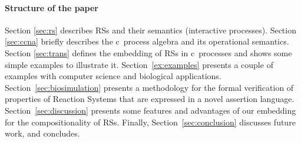\paragraph{Structure of the paper} 

Section \ref{sec:rs} 
describes RSs and their semantics (interactive processes).
Section \ref{sec:ccna} briefly describes  the c\CNA \ process algebra and
its operational semantics.
Section \ref{sec:trans} defines the embedding of RSs in
c\CNA \ processes and shows some simple examples to illustrate 
it.
Section~\ref{ex:examples} presents a couple of examples with computer science and biological applications.
Section~\ref{sec:biosimulation} presents a methodology for the formal verification of
properties of Reaction Systems that are expressed in a novel assertion language.
Section~\ref{sec:discussion} presents some features and 
advantages of our embedding for the compositionality of RSs.
Finally, Section~\ref{sec:conclusion}
discusses future work, and concludes.


